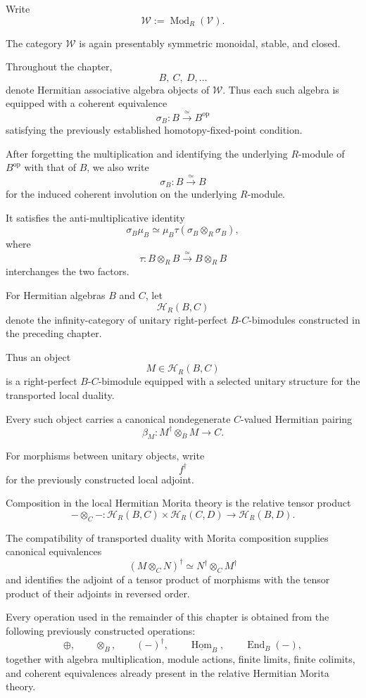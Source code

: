 Write
\[
  \mathcal W
  :=
  \operatorname{Mod}_R(\mathcal V).
\]

The category \(\mathcal W\) is again presentably symmetric monoidal, stable,
and closed.

Throughout the chapter,
\[
  B,\ C,\ D,\ldots
\]
denote Hermitian associative algebra objects of \(\mathcal W\). Thus each such
algebra is equipped with a coherent equivalence
\[
  \sigma_B:
  B
  \xrightarrow{\simeq}
  B^{\mathrm{op}}
\]
satisfying the previously established homotopy-fixed-point condition.

After forgetting the multiplication and identifying the underlying
\(R\)-module of \(B^{\mathrm{op}}\) with that of \(B\), we also write
\[
  \sigma_B:B\xrightarrow{\simeq}B
\]
for the induced coherent involution on the underlying \(R\)-module.

It satisfies the anti-multiplicative identity
\[
  \sigma_B\mu_B
  \simeq
  \mu_B
  \tau
  (\sigma_B\otimes_R\sigma_B),
\]
where
\[
  \tau:B\otimes_RB\xrightarrow{\simeq}B\otimes_RB
\]
interchanges the two factors.

For Hermitian algebras \(B\) and \(C\), let
\[
  \mathcal H_R(B,C)
\]
denote the infinity-category of unitary right-perfect
\(B\)-\(C\)-bimodules constructed in the preceding chapter.

Thus an object
\[
  M\in\mathcal H_R(B,C)
\]
is a right-perfect \(B\)-\(C\)-bimodule equipped with a selected unitary
structure for the transported local duality.

Every such object carries a canonical nondegenerate \(C\)-valued Hermitian
pairing
\[
  \beta_M:
  M^\dagger\otimes_BM
  \longrightarrow
  C.
\]

For morphisms between unitary objects, write
\[
  f^\dagger
\]
for the previously constructed local adjoint.

Composition in the local Hermitian Morita theory is the relative tensor
product
\[
  -\otimes_C-:
  \mathcal H_R(B,C)
  \times
  \mathcal H_R(C,D)
  \longrightarrow
  \mathcal H_R(B,D).
\]

The compatibility of transported duality with Morita composition supplies
canonical equivalences
\[
  (M\otimes_CN)^\dagger
  \simeq
  N^\dagger\otimes_CM^\dagger
\]
and identifies the adjoint of a tensor product of morphisms with the tensor
product of their adjoints in reversed order.

\begin{proposition}
\label{prop:higher-stinespring-inherited-operations}
Every operation used in the remainder of this chapter is obtained from the
following previously constructed operations:
\[
  \oplus,
  \qquad
  \otimes_B,
  \qquad
  (-)^\dagger,
  \qquad
  \underline{\operatorname{Hom}}_B,
  \qquad
  \operatorname{End}_B(-),
\]
together with algebra multiplication, module actions, finite limits, finite
colimits, and coherent equivalences already present in the relative
Hermitian Morita theory.
\end{proposition}

